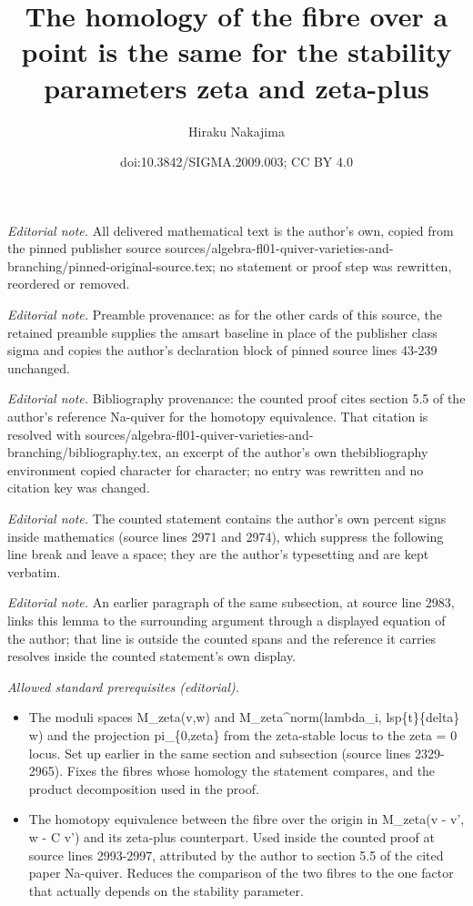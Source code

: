 \documentclass[10pt,a4paper]{amsart}
\title{The homology of the fibre over a point is the same for the stability parameters zeta and zeta-plus}
\author{Hiraku Nakajima}
\date{doi:10.3842/SIGMA.2009.003; CC BY 4.0}
\theoremstyle{definition}
\numberwithin{equation}{section}
\begin{document}
\maketitle
\noindent\textit{Editorial note.} All delivered mathematical text is the author's own, copied from the pinned publisher source sources/algebra-fl01-quiver-varieties-and-branching/pinned-original-source.tex; no statement or proof step was rewritten, reordered or removed.\par\medskip
\noindent\textit{Editorial note.} Preamble provenance: as for the other cards of this source, the retained preamble supplies the amsart baseline in place of the publisher class sigma and copies the author's declaration block of pinned source lines 43-239 unchanged.\par\medskip
\noindent\textit{Editorial note.} Bibliography provenance: the counted proof cites section 5.5 of the author's reference Na-quiver for the homotopy equivalence. That citation is resolved with sources/algebra-fl01-quiver-varieties-and-branching/bibliography.tex, an excerpt of the author's own thebibliography environment copied character for character; no entry was rewritten and no citation key was changed.\par\medskip
\noindent\textit{Editorial note.} The counted statement contains the author's own percent signs inside mathematics (source lines 2971 and 2974), which suppress the following line break and leave a space; they are the author's typesetting and are kept verbatim.\par\medskip
\noindent\textit{Editorial note.} An earlier paragraph of the same subsection, at source line 2983, links this lemma to the surrounding argument through a displayed equation of the author; that line is outside the counted spans and the reference it carries resolves inside the counted statement's own display.\par\medskip
\noindent\textit{Allowed standard prerequisites (editorial).}\begin{itemize}
\item The moduli spaces M\_zeta(v,w) and M\_zeta\textasciicircum{}norm(lambda\_i, lsp\{t\}\{delta\} w) and the projection pi\_\{0,zeta\} from the zeta-stable locus to the zeta = 0 locus. Set up earlier in the same section and subsection (source lines 2329-2965). Fixes the fibres whose homology the statement compares, and the product decomposition used in the proof.
\item The homotopy equivalence between the fibre over the origin in M\_zeta(v - v', w - C v') and its zeta-plus counterpart. Used inside the counted proof at source lines 2993-2997, attributed by the author to section 5.5 of the cited paper Na-quiver. Reduces the comparison of the two fibres to the one factor that actually depends on the stability parameter.
\end{itemize}\medskip
\end{document}
